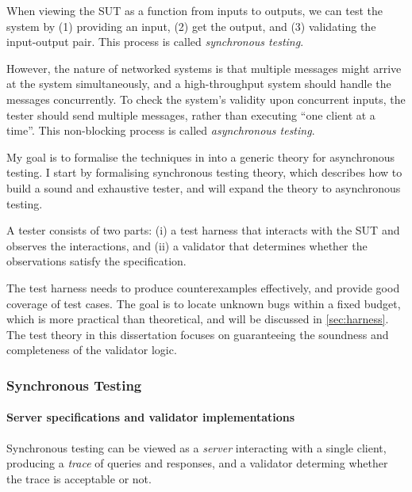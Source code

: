 \documentclass{article}
\theoremstyle{definition}
\begin{document}
When viewing the SUT as a function from inputs to outputs, we can test the
system by (1) providing an input, (2) get the output, and (3) validating the
input-output pair.  This process is called {\em synchronous testing}.

However, the nature of networked systems is that multiple messages might arrive
at the system simultaneously, and a high-throughput system should handle the
messages concurrently.  To check the system's validity upon concurrent inputs,
the tester should send multiple messages, rather than executing ``one client at
a time''.  This non-blocking process is called {\em asynchronous testing}.

My goal is to formalise the techniques in \textcite{li2021modelbased} into a generic
theory for asynchronous testing.  I start by formalising synchronous testing
theory, which describes how to build a sound and exhaustive tester, and will
expand the theory to asynchronous testing.

A tester consists of two parts: (i) a test harness that interacts with the SUT
and observes the interactions, and (ii) a validator that determines whether the
observations satisfy the specification.

The test harness needs to produce counterexamples effectively, and provide good
coverage of test cases.  The goal is to locate unknown bugs within a fixed
budget, which is more practical than theoretical, and will be discussed in
\autoref{sec:harness}.  The test theory in this dissertation focuses on
guaranteeing the soundness and completeness of the validator logic.

\subsubsection{Synchronous Testing}

\paragraph{Server specifications and validator implementations}
Synchronous testing can be viewed as a {\em server} interacting with a single
client, producing a {\em trace} of queries and responses, and a validator
determing whether the trace is acceptable or not.
\end{document}
